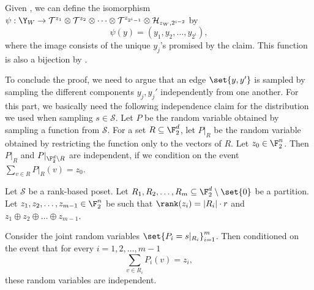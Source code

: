 Given , we can define the isomorphism \(\psi: \Y_W \to \mathcal{T}^{z_1} \otimes \mathcal{T}^{z_2} \otimes \dots \otimes \mathcal{T}^{z_{2^i-1}} \otimes \mathcal{H}_{z_W,2^{i-2}}\) by \begin{equation}\label{eq:iso-for-decomp-lemma}
\psi(y)=(y_1,y_2,\dots,y_{2^i}),
\end{equation}
where the image consists of the unique \(y_j\)'s promised by the claim. This function is also a bijection by .

To conclude the proof, we need to argue that an edge \(\set{y,y'}\) is sampled by sampling the different components \(y_j,y_j'\) independently from one another. For this part, we basically need the following independence claim for the distribution we used when sampling \(s \in \mathcal{S}\). Let \(P\) be the random variable obtained by sampling a function from \(\mathcal{S}\). For a set \(R \subseteq \F_2^d\), let \(P|_R\) be the random variable obtained by restricting the function only to the vectors of \(R\). Let \(z_0 \in \F_2^n\). Then \(P|_{R}\) and \(P|_{\F_2^d \setminus R}\) are independent, if we condition on the event \(\sum_{v \in R}P|_R(v) = z_0\).


\begin{claim} \label{claim:independence-given-sums}
    Let \(\mathcal{S}\) be a rank-based poset. Let \(R_1,R_2,\dots,R_m \subseteq \F_2^d \setminus \set{0}\) be a partition.  Let \(z_1,z_2,\dots,z_{m-1} \in \F_2^n\) be such that \(\rank(z_i) = |R_i|\cdot r\) and \(z_1 \oplus z_2 \oplus \dots \oplus z_{m-1}\). %

    Consider the joint random variables \(\set{P_i = s|_{R_i}}_{i=1}^m\). Then conditioned on the event that for every \(i=1,2,\dots,m-1\)
    \[\sum_{v \in R_i} P_i(v)=z_i,\]
    these random variables are independent.
\end{claim}

